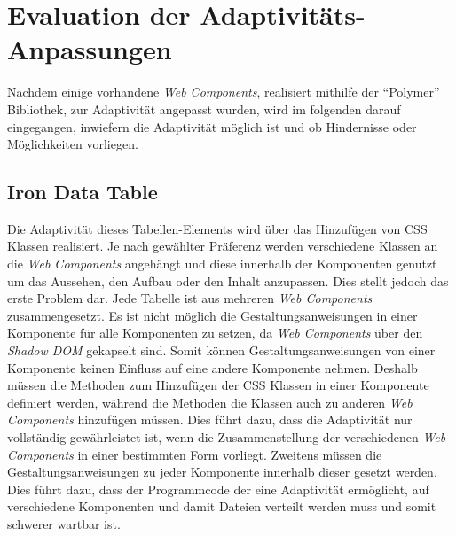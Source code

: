 \documentclass[12pt, paper=a4, bibtotoc, toc=listof, headsepline=true]{scrreprt}
\begin{document}
\chapter{Evaluation der Adaptivitäts-Anpassungen}
Nachdem einige vorhandene \emph{Web Components}, realisiert mithilfe der \enquote{Polymer} Bibliothek, zur Adaptivität angepasst wurden, wird im folgenden darauf eingegangen, inwiefern die Adaptivität möglich ist und ob Hindernisse oder Möglichkeiten vorliegen.
	\section{Iron Data Table}
	\label{sec:evaIroDatTab}
	Die Adaptivität dieses Tabellen-Elements wird über das Hinzufügen von \ac{CSS} Klassen realisiert. Je nach gewählter Präferenz werden verschiedene Klassen an die \emph{Web Components} angehängt und diese innerhalb der Komponenten genutzt um das Aussehen, den Aufbau oder den Inhalt anzupassen. Dies stellt jedoch das erste Problem dar. Jede Tabelle ist aus mehreren \emph{Web Components} zusammengesetzt. Es ist nicht möglich die Gestaltungsanweisungen in einer Komponente für alle Komponenten zu setzen, da \emph{Web Components} über den \emph{Shadow DOM} gekapselt sind. Somit können Gestaltungsanweisungen von einer Komponente keinen Einfluss auf eine andere Komponente nehmen. Deshalb müssen die Methoden zum Hinzufügen der \ac{CSS} Klassen in einer Komponente definiert werden, während die Methoden die Klassen auch zu anderen \emph{Web Components} hinzufügen müssen. Dies führt dazu, dass die Adaptivität nur vollständig gewährleistet ist, wenn die Zusammenstellung der verschiedenen \emph{Web Components} in einer bestimmten Form vorliegt. Zweitens müssen die Gestaltungsanweisungen zu jeder Komponente innerhalb dieser gesetzt werden. Dies führt dazu, dass der Programmcode der eine Adaptivität ermöglicht, auf verschiedene Komponenten und damit Dateien verteilt werden muss und somit schwerer wartbar ist. 
\end{document}
